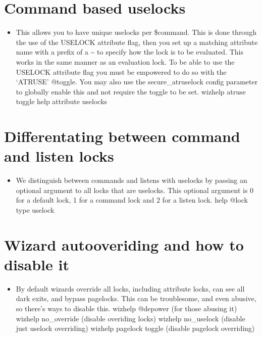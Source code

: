 \documentclass[letterpaper,10pt,english]{sphinxmanual}
\begin{document}
\section{Command based uselocks}
\label{\detokenize{12-advanced:command-based-uselocks}}\begin{itemize}
\item {} 
\sphinxAtStartPar
This allows you to have unique uselocks per \$command.  This is done
through the use of the USELOCK attribute flag, then you set up
a matching attribute name with a prefix of a \textasciitilde{} to specify how
the lock is to be evaluated.  This works in the same manner
as an evaluation lock.  To be able to use the USELOCK attribute flag
you must be empowered to do so with the ‘ATRUSE’ @toggle.  You may
also use the secure\_atruselock config parameter to globally enable
this and not require the toggle to be set.
\sphinxhyphen{} wizhelp atruse toggle
\sphinxhyphen{} help attribute uselocks

\end{itemize}


\section{Differentating between command and listen locks}
\label{\detokenize{12-advanced:differentating-between-command-and-listen-locks}}\begin{itemize}
\item {} 
\sphinxAtStartPar
We distinguish between commands and listens with uselocks by passing
an optional argument to all locks that are uselocks.  This optional
argument is 0 for a default lock, 1 for a command lock and 2 for
a listen lock.
\sphinxhyphen{} help @lock type uselock

\end{itemize}


\section{Wizard auto\sphinxhyphen{}overiding and how to disable it}
\label{\detokenize{12-advanced:wizard-auto-overiding-and-how-to-disable-it}}\begin{itemize}
\item {} 
\sphinxAtStartPar
By default wizards override all locks, including attribute locks,
can see all dark exits, and bypass pagelocks.  This can be
troublesome, and even abusive, so there’s ways to disable this.
\sphinxhyphen{} wizhelp @depower (for those abusing it)
\sphinxhyphen{} wizhelp no\_override (disable overiding locks)
\sphinxhyphen{} wizhelp no\_uselock (disable just uselock overriding)
\sphinxhyphen{} wizhelp pagelock toggle (disable pagelock overriding)

\end{itemize}
\end{document}
